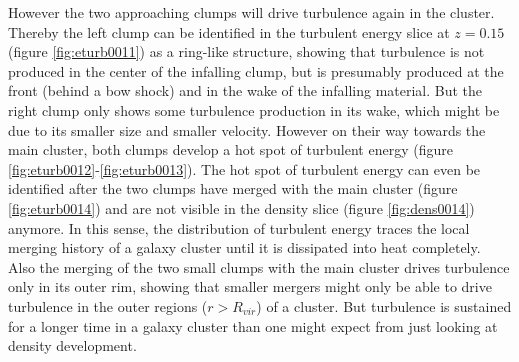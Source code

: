However the two approaching clumps will drive turbulence again in the cluster.
Thereby the left clump can be identified in the turbulent energy slice at
$z=0.15$ (figure \ref{fig:eturb0011}) as a ring-like structure, showing that
turbulence is not produced in the center of the infalling clump, but is
presumably produced at the front (behind a 
bow shock) and in the wake of the infalling material. But the right clump only
shows some turbulence production in its wake, which might be due to its smaller
size and smaller velocity. However on their way towards the main cluster, both
clumps develop a hot spot of turbulent energy (figure
\ref{fig:eturb0012}-\ref{fig:eturb0013}). The hot spot of turbulent energy can
even be identified after the two clumps have merged with the main cluster
(figure \ref{fig:eturb0014}) and are not visible in the density slice (figure
\ref{fig:dens0014}) anymore. In this sense,
the distribution of turbulent energy traces the local merging history of a
galaxy cluster until it is dissipated into heat completely. Also the merging of
the two small clumps with the main cluster drives turbulence only in its
outer rim, showing that smaller mergers might only be able to drive turbulence
in the outer regions ($r > R_{vir}$) of a cluster. But turbulence is
sustained for a longer time in a galaxy cluster than one might expect from just
looking at density development.

